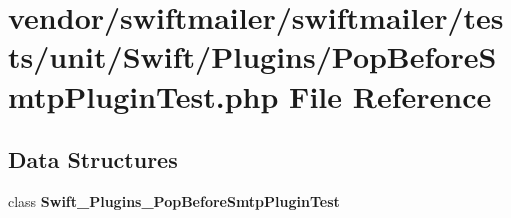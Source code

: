 \section{vendor/swiftmailer/swiftmailer/tests/unit/\+Swift/\+Plugins/\+Pop\+Before\+Smtp\+Plugin\+Test.php File Reference}
\label{_pop_before_smtp_plugin_test_8php}
\subsection*{Data Structures}
\begin{DoxyCompactItemize}
\item 
class {\bf Swift\+\_\+\+Plugins\+\_\+\+Pop\+Before\+Smtp\+Plugin\+Test}
\end{DoxyCompactItemize}
